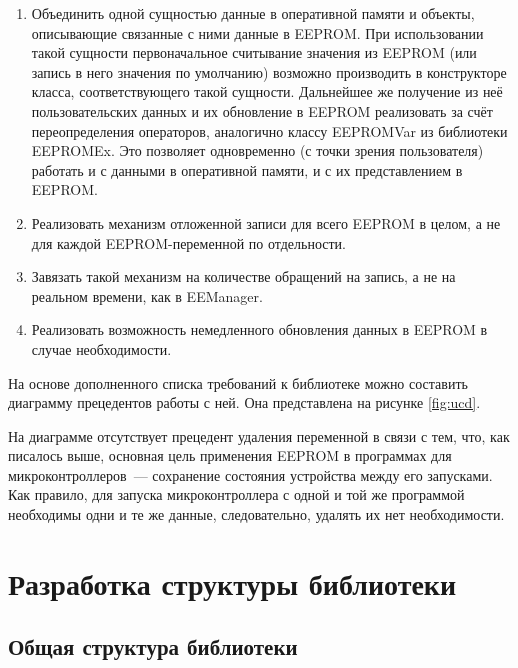 \begin{enumerate}
	\item Объединить одной сущностью данные в оперативной памяти и объекты, описывающие связанные с ними данные в EEPROM.
	При использовании такой сущности первоначальное считывание значения из EEPROM (или запись в него значения по умолчанию) возможно производить в конструкторе класса, соответствующего такой сущности.
	Дальнейшее же получение из неё пользовательских данных и их обновление в EEPROM реализовать за счёт переопределения операторов, аналогично классу EEPROMVar из библиотеки EEPROMEx.
	Это позволяет одновременно (с точки зрения пользователя) работать и с данными в оперативной памяти, и с их представлением в EEPROM.
	\item Реализовать механизм отложенной записи для всего EEPROM в целом, а не для каждой EEPROM-переменной по отдельности.
	\item Завязать такой механизм на количестве обращений на запись, а не на реальном времени, как в EEManager.
	\item Реализовать возможность немедленного обновления данных в EEPROM в случае необходимости.
\end{enumerate}

На основе дополненного списка требований к библиотеке можно составить диаграмму прецедентов работы с ней. Она представлена на рисунке \ref{fig:ucd}.


На диаграмме отсутствует прецедент удаления переменной в связи с тем, что, как писалось выше, основная цель применения EEPROM в программах для  микроконтроллеров~--- сохранение состояния устройства между его запусками.
Как правило, для запуска микроконтроллера с одной и той же программой необходимы одни и те же данные, следовательно, удалять их нет необходимости.

\section{Разработка структуры библиотеки}

\subsection{Общая структура библиотеки} \label{subsection:library-structure}

